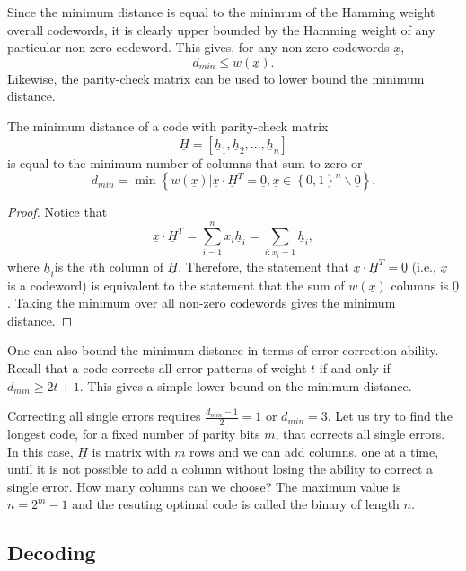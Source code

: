 Since the minimum distance is equal to the minimum of the Hamming weight overall codewords, it is clearly upper bounded by the Hamming weight of any particular non-zero codeword.
This gives, for any non-zero codewords $\underline{x}$,
\[ d_{min} \leq w(\underline{x}). \]
Likewise, the parity-check matrix can be used to lower bound the minimum distance.
\begin{proposition}
The minimum distance of a code with parity-check matrix
\[\underline{H}=\left[\underline{h}_{1},\underline{h}_{2},\ldots,\underline{h}_{n}\right] \]
is equal to the minimum number of columns that sum to zero or
\[ d_{min}=\min\left\{ w(\underline{x})|\underline{x}\cdot\underline{H}^{T}=\underline{0},\underline{x}\in\left\{ 0,1\right\} ^{n}\backslash\underline{0}\right\}. \]
\end{proposition}
\begin{proof}
Notice that
\[ \underline{x}\cdot\underline{H}^{T}=\sum_{i=1}^n x_{i}\underline{h}_{i}=\sum_{i:x_{i}=1}\underline{h}_{i}, \]
where $\underline{h}_{i}$is the $i$th column of $\underline{H}$.
Therefore, the statement that $\underline{x}\cdot\underline{H}^{T}=\underline{0}$ (i.e., $\underline{x}$ is a codeword) is equivalent to the statement that the sum of $w(\underline{x})$ columns is $\underline{0}$.
Taking the minimum over all non-zero codewords gives the minimum distance.
\end{proof}

One can also bound the minimum distance in terms of error-correction ability.
Recall that a code corrects all error patterns of weight $t$ if and only if $d_{min}\geq2t+1$.
This gives a simple lower bound on the minimum distance.

\begin{example}
Correcting all single errors requires $\frac{d_{min}-1}{2}=1$ or $d_{min}=3$.
Let us try to find the longest code, for a fixed number of parity bits $m$, that corrects all single errors.
In this case, $\underline{H}$ is  matrix with $m$ rows and we can add columns, one at a time, until it is not possible to add a column without losing the ability to correct a single error.
How many columns can we choose?
The maximum value is $n=2^m -1$ and the resuting optimal code is called the binary  of length $n$.
\end{example}

\subsection{Decoding}


